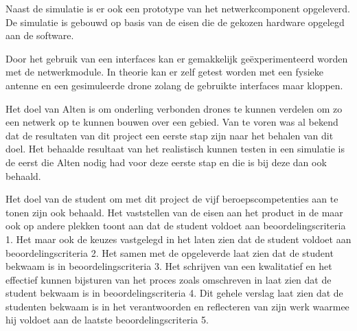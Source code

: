 \documentclass[a4paper, 11pt, oneside]{report}
\begin{document}
Naast de simulatie is er ook een prototype van het netwerkcomponent opgeleverd. 
De simulatie is gebouwd op basis van de eisen die de gekozen hardware opgelegd aan de software.
 
Door het gebruik van een interfaces kan er gemakkelijk geëxperimenteerd worden met de netwerkmodule.
In theorie kan er zelf getest worden met een fysieke antenne en een gesimuleerde drone zolang de gebruikte interfaces maar kloppen.

Het doel van Alten is om onderling verbonden drones te kunnen verdelen om zo een netwerk op te kunnen bouwen over een gebied.
Van te voren was al bekend dat de resultaten van dit project een eerste stap zijn naar het behalen van dit doel.
Het behaalde resultaat van het realistisch kunnen testen in een simulatie is de eerst die Alten nodig had voor deze eerste stap en die is bij deze dan ook behaald.

Het doel van de student om met dit project de vijf beroepscompetenties aan te tonen zijn ook behaald. Het vaststellen van de eisen aan het product in de  maar ook op andere plekken toont aan dat de student voldoet aan beoordelingscriteria 1. Het  maar ook de keuzes vastgelegd in het  laten zien dat de student voldoet aan beoordelingscriteria 2. Het  samen met de opgeleverde  laat zien dat de student bekwaam is in beoordelingscriteria 3. Het schrijven van een kwalitatief  en het effectief kunnen bijsturen van het proces zoals omschreven in  laat zien dat de student bekwaam is in beoordelingscriteria 4.
Dit gehele verslag laat zien dat de studenten bekwaam is in het verantwoorden en reflecteren van zijn werk waarmee hij voldoet aan de laatste beoordelingscriteria 5.
\end{document}
